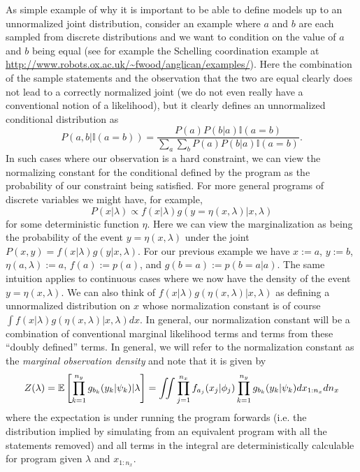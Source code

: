 As simple example of why it is important to be able to define models up to an unnormalized joint
distribution, consider an example where $a$ and $b$ are each sampled from discrete distributions
and we want to condition on the value of $a$ and $b$ being equal (see for example the Schelling
coordination example at {\small \url{http://www.robots.ox.ac.uk/~fwood/anglican/examples/}}).  Here
the combination of the sample statements and the observation that the two are equal clearly
does not lead to a correctly normalized joint (we do not even really have a conventional notion
of a likelihood), but it clearly defines an unnormalized conditional distribution as
\[
P(a,b | \mathbb{I}(a=b)) = \frac{P(a)P(b|a)\mathbb{I}(a=b)}{\sum_a \sum_b P(a)P(b|a) \mathbb{I}(a=b)}.
\]
In such cases where our observation is a hard constraint, we can view the normalizing constant for
the conditional defined by the program as the probability of our constraint being satisfied.  
For more general programs of discrete variables we might have, for example,
\[
P(x|\lambda) \propto f(x|\lambda)g(y=\eta(x,\lambda)|x,\lambda)
\]
for some deterministic function $\eta$.  Here we
can view the marginalization as being the probability of the event $y=\eta(x,\lambda)$ under the joint $P(x,y)=f(x|\lambda)g(y|x,\lambda)$.
For our previous example we have $x:=a$, $y:=b$, $\eta(a,\lambda):=a$, $f(a):=p(a)$, and $g(b=a):=p(b=a|a)$.
The same intuition applies to continuous cases where we now have the density of the event $y=\eta(x,\lambda)$.
We can also think of $f(x|\lambda)g(\eta(x,\lambda)|x,\lambda)$ as defining a unnormalized distribution on $x$ whose
normalization constant is of course $\int f(x|\lambda)g(\eta(x,\lambda)|x,\lambda) dx$.  In general, our normalization
constant will be a combination of conventional marginal likelihood terms and terms from these ``doubly defined''
terms.  In general, we will refer to the normalization constant as the \emph{marginal observation density} and note
that it is given by
\begin{align}
\label{eq:probprog:mod}
Z(\lambda) = \mathbb{E} \left[ \prod_{k=1}^{n_y} g_{b_k}(y_k | \psi_k) | \lambda \right]
= \iint \prod_{j=1}^{n_x} f_{a_j}(x_j | \phi_j) \prod_{k=1}^{n_y} g_{b_k}(y_k | \psi_k) dx_{1:n_x} dn_x
\end{align}
where the expectation is under running the program forwards (i.e. the distribution implied by simulating
from an equivalent program with all the \observe statements removed) and 
all terms in the integral are deterministically calculable for program given $\lambda$ and $x_{1:n_x}$.

